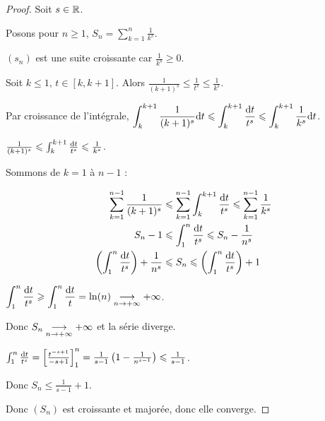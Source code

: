 \begin{proof}
    Soit $s \in \mathbb{R}$. 

    Posons pour $\displaystyle n \geqslant 1, \, S_n = \sum_{k = 1 }^{n} \frac{1}{k^s}$.

    $(s_n)$ est une suite croissante car $\frac 1 {k^s} \geqslant 0$. 

    Soit $k \leqslant 1, \, t \in [k, k+1]$. Alors $\frac 1 {(k + 1)^s} \leqslant \frac 1 {t^s} \leqslant \frac 1 {k^s}$.

    \svspace Par croissance de l'intégrale, $\displaystyle \int_{k }^{k + 1} \frac 1 {(k + 1)^s} \text d t \leqslant \int_{k }^{k + 1} \frac{\text d t}{t^s} \leqslant \int_{k }^{k + 1} \frac 1 {k^s} \text d t$.

    $\frac 1 {(k + 1)^s} \leqslant \int_{k }^{k + 1} \frac{\text d t}{t^s} \leqslant \frac 1 {k^s}$.

    Sommons de $k = 1$ à $n - 1$ : 

    \begin{align*}
        \sum_{k = 1}^{n - 1} \frac 1 {(k + 1)^s} & \leqslant \sum_{k = 1}^{n - 1} \int_{k }^{k + 1} \frac{\text d t}{t^s} \leqslant \sum_{k = 1}^{n - 1} \frac 1 {k^s} \\
        S_n - 1 & \leqslant \int_{1 }^{n } \frac{\text d t}{t^s} \leqslant S_n  - \frac 1 {n^s} \\
        \left( \int_{1}^{n } \frac{\text d t}{t^s} \right) + \frac 1 {n^s} & \leqslant S_n \leqslant \left( \int_{1 }^{n } \frac{\text d t}{t^s} \right) + 1
    \end{align*}


    \avspace $\displaystyle \int_{1 }^{n} \frac{\text d t}{t^s}  \geqslant \int_{1 }^{n } \frac{\text d t}{t} = \ln(n) \underset{n \to + \infty}{\longrightarrow} +\infty$.

    Donc $S_n \underset{n \to + \infty}{\longrightarrow} +\infty$ et la série diverge. 


    \svspace $\int_{1 }^{n} \frac{\text d t}{t^s}  = \left[ \frac{t^{-s + 1}}{-s + 1} \right]_{1}^{n} = \frac 1 {s - 1} \left( 1 - \frac 1 {n^{s - 1}} \right) \leqslant \frac 1 {s - 1}$.

    Donc $S_n \leqslant \frac 1 {s - 1} + 1$.

    Donc $(S_n)$ est croissante et majorée, donc elle converge.

\end{proof}

